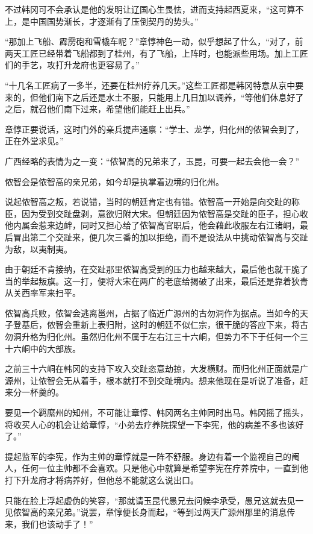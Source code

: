 不过韩冈可不会承认是他的发明让辽国心生畏怯，进而支持起西夏来，“这可算不上，是中国国势渐长，才逐渐有了压倒契丹的势头。”

“那加上飞船、霹雳砲和雪橇车呢？”章惇神色一动，似乎想起了什么，“对了，前两天工匠已经带着飞船都到了桂州，有了飞船，上阵时，也能派些用场。加上工匠们的手艺，攻打升龙府也更容易了。”

“十几名工匠病了一多半，还要在桂州疗养几天。”这些工匠都是韩冈特意从京中要来的，但他们南下之后还是水土不服，只能用上几日加以调养，“等他们休息好了之后，就召他们南下过来，希望他们能赶上出兵。”

章惇正要说话，这时门外的亲兵提声通禀：“学士、龙学，归化州的侬智会到了，正在外堂求见。”

广西经略的表情为之一变：“侬智高的兄弟来了，玉昆，可要一起去会他一会？”

侬智会是侬智高的亲兄弟，如今却是执掌着边境的归化州。

说起侬智高之叛，若说错，当时的朝廷肯定也有错。侬智高一开始是向交趾的称臣，因为受到交趾盘剥，意欲归附大宋。但朝廷因为侬智高是交趾的臣子，担心收他内属会惹来边衅，同时又担心给了侬智高官职后，他会藉此收服左右江诸峒，最后冒出第二个交趾来，便几次三番的加以拒绝，而不是设法从中挑动侬智高与交趾为敌，以夷制夷。

由于朝廷不肯接纳，在交趾那里侬智高受到的压力也越来越大，最后他也就干脆了当的举起叛旗。这一打，便将大宋在两广的老底给揭破了出来，最后还是靠着狄青从关西率军来扫平。

侬智高兵败，侬智会逃离邕州，占据了临近广源州的古勿洞作为据点。当如今的天子登基后，侬智会重新上表归附，这时的朝廷不似仁宗，很干脆的答应下来，将古勿洞升格为归化州。虽然归化州不属于左右江三十六峒，但势力不下于任何一个三十六峒中的大部族。

之前三十六峒在韩冈的支持下攻入交趾恣意劫掠，大发横财。而归化州正面就是广源州，让侬智会无从着手，根本就打不到交趾境内。想来他现在是听说了准备，赶来分一杯羹的。

要见一个羁縻州的知州，不可能让章惇、韩冈两名主帅同时出马。韩冈摇了摇头，将收买人心的机会让给章惇，“小弟去疗养院探望一下李宪，他的病差不多也该好了。”

提起监军的李宪，作为主帅的章惇就是一阵不舒服。身边有着一个监视自己的阉人，任何一位主帅都不会喜欢。只是他心中就算是希望李宪在疗养院中，一直到他打下升龙府才将病养好，但他总不能就这么说出口。

只能在脸上浮起虚伪的笑容，“那就请玉昆代愚兄去问候李承受，愚兄这就去见一见侬智高的亲兄弟。”说罢，章惇便长身而起，“等到过两天广源州那里的消息传来，我们也该动手了！”

